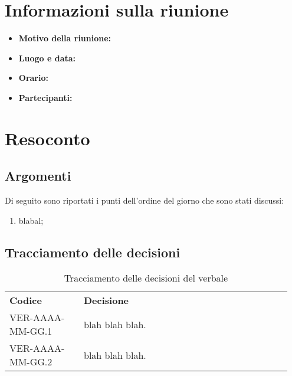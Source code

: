 \documentclass[VER-AAAA-MM-GG.tex]{subfiles}
\begin{document}
\chapter{Informazioni sulla riunione}
\begin{itemize}
	\item \textbf{Motivo della riunione:}
	\item \textbf{Luogo e data:}
	\item \textbf{Orario:} 
	\item \textbf{Partecipanti:}
\end{itemize}



\chapter{Resoconto}
\section{Argomenti}
Di seguito sono riportati i punti dell'ordine del giorno che sono stati discussi:
\begin{enumerate}
	\item blabal;
\end{enumerate}
\section{Tracciamento delle decisioni}
\begin{table}[H]
	\begin{center}
		\begin{tabu} to 
			\tableHeaderStyle
			\textbf{Codice} & \textbf{Decisione} \\
			VER-AAAA-MM-GG.1 & blah blah blah. \\
			VER-AAAA-MM-GG.2 & blah blah blah. \\
		\end{tabu}
		\caption{Tracciamento delle decisioni del verbale}
	\end{center}
\end{table}
\end{document}
